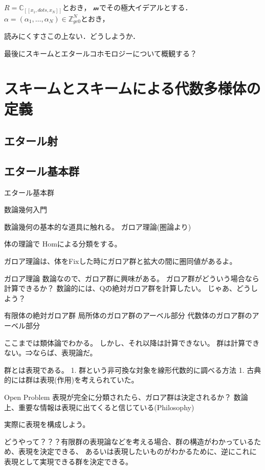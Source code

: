 \documentclass{ujarticle}
\begin{document}
$R=\mathbb{C}_[[x_1,dots,x_N]]$とおき，
$\mathcal{m}$でその極大イデアルとする．$\alpha=(\alpha_1,\dots,\alpha_N)\in
\mathbb{Z}_{ge 0}^N$とおき，



読みにくすさこの上ない．どうしようか．


最後にスキームとエタールコホモロジーについて概観する？


\section{スキームとスキームによる代数多様体の定義}
\label{sub:スキームの定義}

\subsection{エタール射}
\label{sub:エタール射}

\subsection{エタール基本群}
\label{sub:エタール基本群}

エタール基本群


数論幾何入門

数論幾何の基本的な道具に触れる。
ガロア理論(圏論より)

体の理論で
Homによる分類をする。

ガロア理論は、体をFixした時にガロア群と拡大の間に圏同値があるよ。

ガロア理論
数論なので、ガロア群に興味がある。
ガロア群がどういう場合なら計算できるか？
数論的には、Qの絶対ガロア群を計算したい。
じゃあ、どうしよう？

有限体の絶対ガロア群
局所体のガロア群のアーベル部分
代数体のガロア群のアーベル部分

ここまでは類体論でわかる。
しかし、それ以降は計算できない。
群は計算できない。⇒ならば、表現論だ。

群とは表現である。
1. 群という非可換な対象を線形代数的に調べる方法
1. 古典的には群は表現(作用)を考えられていた。

Open Problem 表現が完全に分類されたら、ガロア群は決定されるか？
数論上、重要な情報は表現に出てくると信じている(Philosophy)

実際に表現を構成しよう。

どうやって？？？有限群の表現論などを考える場合、群の構造がわかっているため、表現を決定できる、
あるいは表現したいものがわかるために、逆にこれに表現として実現できる群を決定できる。
\end{document}
